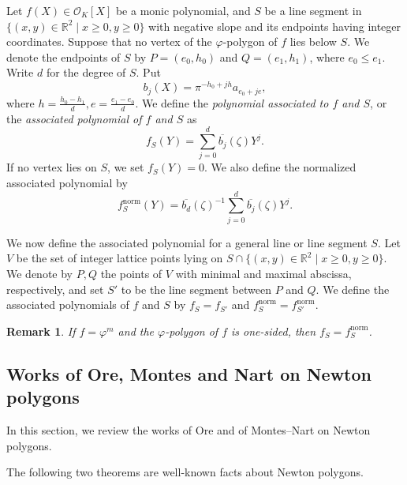 \documentclass[10pt,a4paper]{amsart}
\newcommand{\field}[1]{\mathbb{#1}}
\newcommand{\R}{\field{R}}
\newtheorem{remark}[theorem]{Remark}
\numberwithin{equation}{section}
\begin{document}
    Let $f(X) \in \mathcal{O}_K[X]$ be a monic polynomial, and $S$ be a line segment 
    in $\{ (x,y) \in \R^2 \mid x \ge 0, y \ge 0 \}$ with negative slope and its endpoints having integer coordinates. 
    Suppose that no vertex of the $\varphi$-polygon of $f$ lies below $S$. 
    We denote the endpoints of $S$ by $P = (e_0,h_0)$ and $Q = (e_1,h_1)$, where $e_0 \le e_1$. 
    Write $d$ for the degree of $S$. 
    Put 
    \[
      b_j(X) = \pi^{-h_0 + jh} a_{e_0 + je}, 
    \]
    where $h = \frac{h_0 - h_1}{d}, e = \frac{e_1 - e_0}{d}$. 
    We define the \emph{polynomial associated to $f$ and $S$}, or the \emph{associated polynomial of $f$ and $S$} 
    as 
    \[
      f_S(Y) = \sum_{j=0}^d \overline{b_j}(\zeta) Y^j.
    \]
    If no vertex lies on $S$, we set $f_S(Y) = 0$. 
    We also define the normalized associated polynomial by 
    \[
      f_S^{\mathrm{norm}}(Y) = \overline{b_d}(\zeta)^{-1} \sum_{j=0}^d \overline{b_j}(\zeta) Y^j.
    \]

    We now define the associated polynomial for a general line or line segment $S$. 
    Let $V$ be the set of integer lattice points lying on $S \cap \{ (x,y) \in \R^2 \mid x \ge 0, y \ge 0 \}$. 
    We denote by $P, Q$ the points of $V$ with minimal and maximal abscissa, respectively, and 
    set $S'$ to be the line segment between $P$ and $Q$. 
    We define the associated polynomials of $f$ and $S$ by $f_S = f_{S'}$ and $f^{\mathrm{norm}}_S = f^{\mathrm{norm}}_{S'}$. 

    \begin{remark}
      If $f = \varphi^m$ and the $\varphi$-polygon of $f$ is one-sided, then $f_S = f_S^{\mathrm{norm}}$. 
    \end{remark}

  \subsection{Works of Ore, Montes and Nart on Newton polygons}\label{sec:Ore Montes Nart}
    
    In this section, we review the works of Ore and of Montes--Nart on Newton polygons. 

    The following two theorems are well-known facts about Newton polygons.
\end{document}
